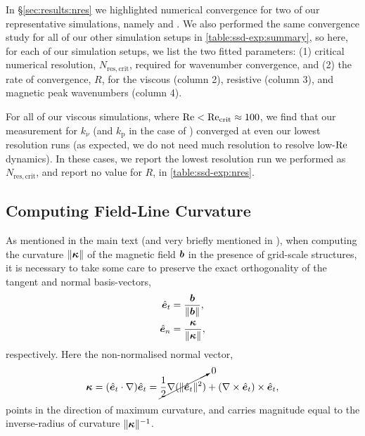 In \S\ref{sec:results:nres} we highlighted numerical convergence for two of our representative simulations, namely  and . We also performed the same convergence study for all of our other simulation setups in \autoref{table:ssd-exp:summary}, so here, for each of our simulation setups, we list the two fitted parameters: (1) critical numerical resolution, $N_{\mathrm{res}, \mathrm{crit}}$, required for wavenumber convergence, and (2) the rate of convergence, $R$, for the viscous (column 2), resistive (column 3), and magnetic peak wavenumbers (column 4).

For all of our viscous simulations, where $\mathrm{Re} < \mathrm{Re}_\mathrm{crit} \approx 100$, we find that our measurement for $k_\nu$ (and $k_\mathrm{p}$ in the case of ) converged at even our lowest resolution runs (\ie as expected, we do not need much resolution to resolve low-$\mathrm{Re}$ dynamics). In these cases, we report the lowest resolution run we performed as $N_{\mathrm{res}, \mathrm{crit}}$, and report no value for $R$, in \autoref{table:ssd-exp:nres}.



\subsection{Computing Field-Line Curvature}
\label{app:kappa}

As mentioned in the main text (and very briefly mentioned in \citet{schekochihin2004simulations}), when computing the curvature $\|\bm{\kappa}\|$ of the magnetic field $\bm{b}$ in the presence of grid-scale structures, it is necessary to take some care to preserve the exact orthogonality of the tangent and normal basis-vectors,
\begin{align}
    \hat{\bm{e}}_{t}
        &= \frac{\bm{b}}{\|\bm{b}\|} , \\
    \hat{\bm{e}}_{n}
        &= \frac{\bm{\kappa}}{\|\bm{\kappa}\|}
    , \label{eqn:nbasis}
\end{align}
respectively. Here the non-normalised normal vector,
\begin{align}
    \bm{\kappa}
        = (\hat{\bm{e}}_{t}\cdot\nabla)\hat{\bm{e}}_{t}
        = \cancelto{0}{\frac{1}{2} \nabla(\|\hat{\bm{e}}_{t}\|^2)}
            + (\nabla\times\hat{\bm{e}}_{t}) \times \hat{\bm{e}}_{t}
        ,
\end{align}
points in the direction of maximum curvature, and carries magnitude equal to the inverse-radius of curvature $\|\bm{\kappa}\|^{-1}$.

